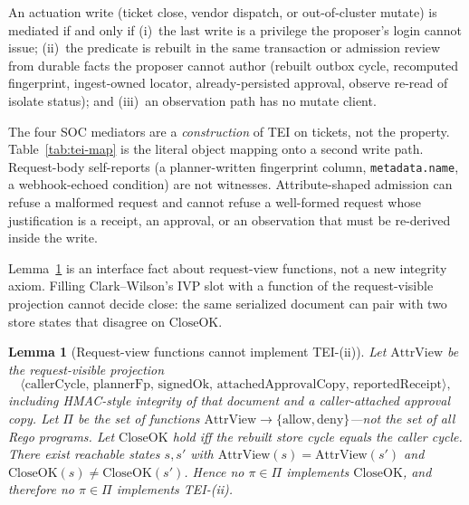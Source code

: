 \documentclass[acmsmall,manuscript,review,anonymous]{acmart}
\renewcommand{\_}{\discretionary{\textunderscore}{}{\textunderscore}}
\newtheorem{lemma}{Lemma}
\begin{document}
\begin{definition}[TEI]
\label{def:tei}
An actuation write (ticket close, vendor dispatch, or out-of-cluster
mutate) is mediated if and only if (i)~the last write is a privilege the
proposer's login cannot issue; (ii)~the predicate is rebuilt in the same
transaction or admission review from durable facts the proposer cannot
author (rebuilt outbox cycle, recomputed fingerprint, ingest-owned
locator, already-persisted approval, observe re-read of isolate status);
and (iii)~an observation path has no mutate client.
\end{definition}

The four SOC mediators are a \emph{construction} of TEI on tickets, not
the property. Table~\ref{tab:tei-map} is the literal object mapping onto
a second write path. Request-body self-reports (a planner-written
fingerprint column, \texttt{metadata.name}, a webhook-echoed
condition) are not witnesses. Attribute-shaped admission can refuse a
malformed request and cannot refuse a well-formed request whose
justification is a receipt, an approval, or an observation that must be
re-derived inside the write.

Lemma~\ref{thm:attr} is an interface fact about request-view functions,
not a new integrity axiom. Filling Clark--Wilson's {IVP} slot with a
function of the request-visible projection cannot decide close: the same
serialized document can pair with two store states that disagree on
$\mathrm{CloseOK}$.

\begin{lemma}[Request-view functions cannot implement TEI-(ii)]
\label{thm:attr}
Let $\mathrm{AttrView}$ be the request-visible projection
\[
\langle\mathrm{callerCycle},\,\mathrm{plannerFp},\,\mathrm{signedOk},\,
\mathrm{attachedApprovalCopy},\,\mathrm{reportedReceipt}\rangle,
\]
including {HMAC}-style integrity of that document and a caller-attached
approval copy. Let $\Pi$ be the set of functions
$\mathrm{AttrView}\to\{\mathrm{allow},\mathrm{deny}\}$---not the set of
all {Rego} programs. Let $\mathrm{CloseOK}$ hold iff the rebuilt store
cycle equals the caller cycle. There exist reachable states $s,s'$ with
$\mathrm{AttrView}(s)=\mathrm{AttrView}(s')$ and
$\mathrm{CloseOK}(s)\neq\mathrm{CloseOK}(s')$.
Hence no $\pi\in\Pi$ implements $\mathrm{CloseOK}$, and therefore no
$\pi\in\Pi$ implements TEI-(ii).
\end{lemma}
\end{document}
